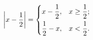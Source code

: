 \documentclass[nofonts]{ctexart}
\begin{document}
\[
	\left\lvert x - \frac{1}{2} \right\rvert = 
	\begin{dcases}
		x-\frac{1}{2}, & x \geq \frac{1}{2};	\\
		\frac{1}{2}-x, & x < \frac{1}{2}.
	\end{dcases}
\]
\end{document}
